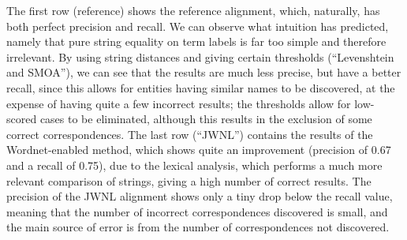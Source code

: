 The first row (reference) shows the reference alignment, which, naturally, has both perfect precision and recall. We can observe what intuition has predicted, namely that pure string equality on term labels is far too simple and therefore irrelevant. By using string distances and giving certain thresholds (``Levenshtein and SMOA''), we can see that the results are much less precise, but have a better recall, since this allows for entities having similar names to be discovered, at the expense of having quite a few incorrect results; the thresholds allow for low-scored cases to be eliminated, although this results in the exclusion of some correct correspondences. The last row (``JWNL'') contains the results of the Wordnet-enabled method, which shows quite an improvement (precision of 0.67 and a recall of 0.75),
due to the lexical analysis, which performs a much more relevant comparison of strings, giving a high number of correct results. The precision of the JWNL alignment shows only a tiny drop below the recall value, meaning that the number of incorrect correspondences discovered is small, and the main source of error is from the number of correspondences not discovered.


% 


